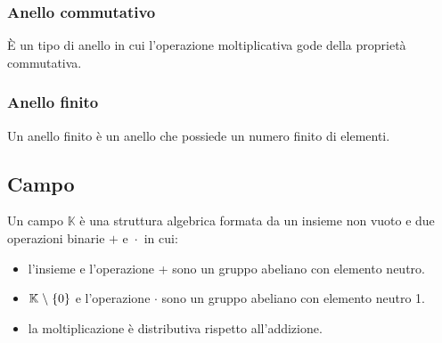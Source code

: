 \subsubsection{Anello commutativo}

\textsf{\small È un tipo di anello in cui l'operazione moltiplicativa gode della proprietà commutativa.}

\subsubsection{Anello finito} %

\textsf{\small Un anello finito è un anello che possiede un numero finito di elementi.}


\subsection{Campo} %


\textsf{\small Un campo $\mathbb{K}$ è una struttura algebrica formata da un insieme non vuoto e due operazioni binarie $+ \text{ e } \cdot$ in cui:}

\begin{itemize}
	\item \textsf{\small l'insieme e l'operazione + sono un gruppo abeliano con elemento neutro.}
	\item \textsf{\small $\mathbb{K} \hspace{.1cm} \backslash \hspace{.1cm} \{0\}$ e l'operazione $\cdot$ sono un gruppo abeliano con elemento neutro 1.}
	\item \textsf{\small la moltiplicazione è distributiva rispetto all'addizione.}
\end{itemize}

